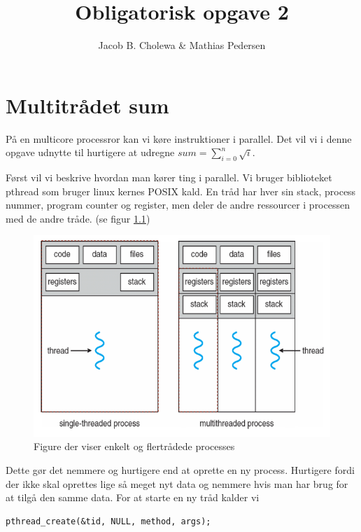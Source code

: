 \documentclass[danish]{report}
\title{Obligatorisk opgave 2}
\author{Jacob B. Cholewa \& Mathias Pedersen }
\begin{document}
\maketitle
\chapter{Multitrådet sum}
På en multicore processror kan vi køre instruktioner i parallel. Det vil vi i denne opgave udnytte til hurtigere at udregne $ sum = \displaystyle\sum\limits_{i=0}^n \sqrt{i} $.

Først vil vi beskrive hvordan man kører ting i parallel. Vi bruger biblioteket pthread som bruger linux kernes POSIX kald. En tråd har hver sin stack, process nummer, program counter og register, men deler de andre ressourcer i processen med de andre tråde. (se figur \ref{fig:1})


\begin{figure}[H]
\begin{center}
\includegraphics[scale=0.4]{img/1.png}
\caption{Figure der viser enkelt og flertrådede processes}
\label{fig:1}
\end{center}
\end{figure}


Dette gør det nemmere og hurtigere end at oprette en ny process. Hurtigere fordi der ikke skal oprettes lige så meget nyt data og nemmere hvis man har brug for at tilgå den samme data. For at starte en ny tråd kalder vi



\begin{lstlisting}
pthread_create(&tid, NULL, method, args);
\end{lstlisting}
\end{document}
